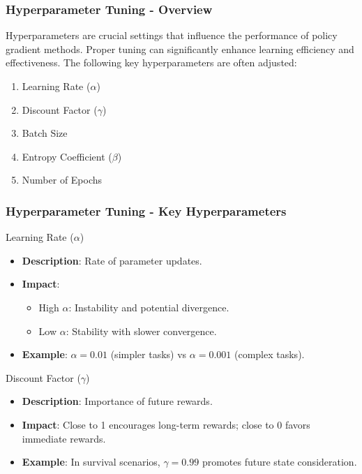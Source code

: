 \documentclass[aspectratio=169]{beamer}
\begin{document}
\begin{frame}[fragile]
    \frametitle{Hyperparameter Tuning - Overview}
    Hyperparameters are crucial settings that influence the performance of policy gradient methods. Proper tuning can significantly enhance learning efficiency and effectiveness. The following key hyperparameters are often adjusted:
    
    \begin{enumerate}
        \item Learning Rate ($\alpha$)
        \item Discount Factor ($\gamma$)
        \item Batch Size
        \item Entropy Coefficient ($\beta$)
        \item Number of Epochs
    \end{enumerate}
\end{frame}

\begin{frame}[fragile]
    \frametitle{Hyperparameter Tuning - Key Hyperparameters}
    \begin{block}{Learning Rate ($\alpha$)}
        \begin{itemize}
            \item \textbf{Description}: Rate of parameter updates.
            \item \textbf{Impact}:
            \begin{itemize}
                \item High $\alpha$: Instability and potential divergence.
                \item Low $\alpha$: Stability with slower convergence.
            \end{itemize}
            \item \textbf{Example}: $\alpha = 0.01$ (simpler tasks) vs $\alpha = 0.001$ (complex tasks).
        \end{itemize}
    \end{block}
    
    \begin{block}{Discount Factor ($\gamma$)}
        \begin{itemize}
            \item \textbf{Description}: Importance of future rewards.
            \item \textbf{Impact}: Close to 1 encourages long-term rewards; close to 0 favors immediate rewards.
            \item \textbf{Example}: In survival scenarios, $\gamma = 0.99$ promotes future state consideration.
        \end{itemize}
    \end{block}
\end{frame}
\end{document}
